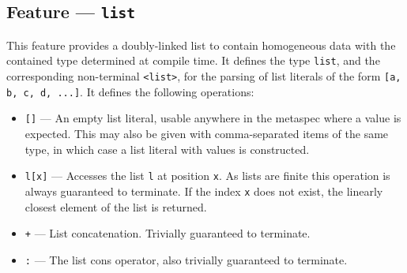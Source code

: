 \subsection{Feature --- \texttt{list}} %
\label{sub:feature_list}
This feature provides a doubly-linked list to contain homogeneous data with the contained type determined at compile time. 
It defines the type \texttt{list}, and the corresponding non-terminal \texttt{<list>}, for the parsing of list literals of the form \texttt{[a, b, c, d, ...]}.
It defines the following operations:
\begin{itemize}
    \item \texttt{[]} --- An empty list literal, usable anywhere in the \gls{metaspec} where a value is expected. 
    This may also be given with comma-separated items of the same type, in which case a list literal with values is constructed.
    \item \texttt{l[x]} --- Accesses the list \texttt{l} at position \texttt{x}. 
    As lists are finite this operation is always guaranteed to terminate.
    If the index \texttt{x} does not exist, the linearly closest element of the list is returned. 
    \item \texttt{+} --- List concatenation.
    Trivially guaranteed to terminate.
    \item \texttt{:} --- The list cons operator, also trivially guaranteed to terminate.
\end{itemize}


